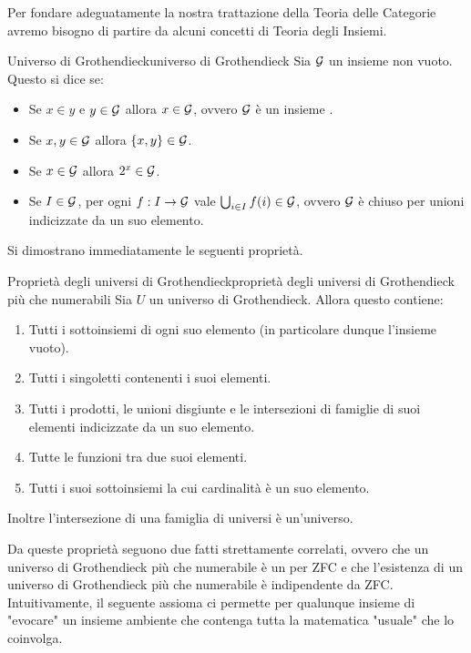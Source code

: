 \documentclass[openany]{book}
\begin{document}
Per fondare adeguatamente la nostra trattazione della Teoria delle Categorie avremo bisogno di partire da alcuni concetti di Teoria degli Insiemi.

\begin{definition}{Universo di Grothendieck}{universo di Grothendieck}
    Sia $\mathcal{G}$ un insieme non vuoto. Questo si dice  se:\begin{itemize}
        \item Se $x\in y$ e $y \in \mathcal{G}$ allora $x \in \mathcal{G}$, ovvero $\mathcal{G}$ è un insieme .
        \item Se $x,y \in \mathcal{G}$ allora $\{x,y\}\in\mathcal{G}$.
        \item Se $x \in \mathcal{G}$ allora $2^x \in \mathcal{G}$.
        \item Se $I \in \mathcal{G}$, per ogni $f: I \to \mathcal{G}$ vale $\bigcup_{i \in I}f(i)\in \mathcal{G}$, ovvero $\mathcal{G}$ è chiuso per unioni indicizzate da un suo elemento.
    \end{itemize}
\end{definition}

Si dimostrano immediatamente le seguenti proprietà.

\begin{proposition}{Proprietà degli universi di Grothendieck}{proprietà degli universi di Grothendieck più che numerabili}
    Sia $U$ un universo di Grothendieck. Allora questo contiene:\begin{enumerate}
        \item Tutti i sottoinsiemi di ogni suo elemento (in particolare dunque l'insieme vuoto).
        \item Tutti i singoletti contenenti i suoi elementi.
        \item Tutti i prodotti, le unioni disgiunte e le intersezioni di famiglie di suoi elementi indicizzate da un suo elemento.
        \item Tutte le funzioni tra due suoi elementi.
        \item Tutti i suoi sottoinsiemi la cui cardinalità è un suo elemento.
    \end{enumerate}
    Inoltre l'intersezione di una famiglia di universi è un'universo.
\end{proposition} 

Da queste proprietà seguono due fatti strettamente correlati, ovvero che un universo di Grothendieck più che numerabile è un  per ZFC e che l'esistenza di un universo di Grothendieck più che numerabile è indipendente da ZFC.\\
Intuitivamente, il seguente assioma ci permette per qualunque insieme di "evocare" un insieme ambiente che contenga tutta la matematica "usuale" che lo coinvolga.
\end{document}
